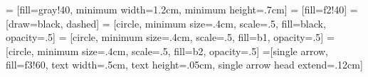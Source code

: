  = [fill=gray!40, minimum width=1.2cm, minimum height=.7cm]
 = [fill=f2!40]
 = [draw=black, dashed]
 = [circle, minimum size=.4cm, scale=.5, fill=black, opacity=.5]
 = [circle, minimum size=.4cm, scale=.5, fill=b1, opacity=.5]
 = [circle, minimum size=.4cm, scale=.5, fill=b2, opacity=.5]
 =[single arrow, fill=f3!60, text width=.5cm, text height=.05cm, single arrow head extend=.12cm]
